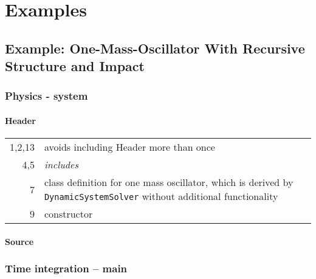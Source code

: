 \section{Examples}

\subsection{Example: One-Mass-Oscillator With Recursive Structure and Impact}

\hspace*{0.2\hsize}

\subsubsection{Physics - system}

\paragraph{Header}


\begin{tabular}{r|p{0.85\hsize}}
  1,2,13 & avoids including Header more than once\\
  4,5  & \emph{includes}\\
  7 & class definition for one mass oscillator, which is derived by \texttt{DynamicSystemSolver} without additional functionality\\
  9 & constructor
\end{tabular}

\paragraph{Source}


\subsubsection{Time integration -- main}

